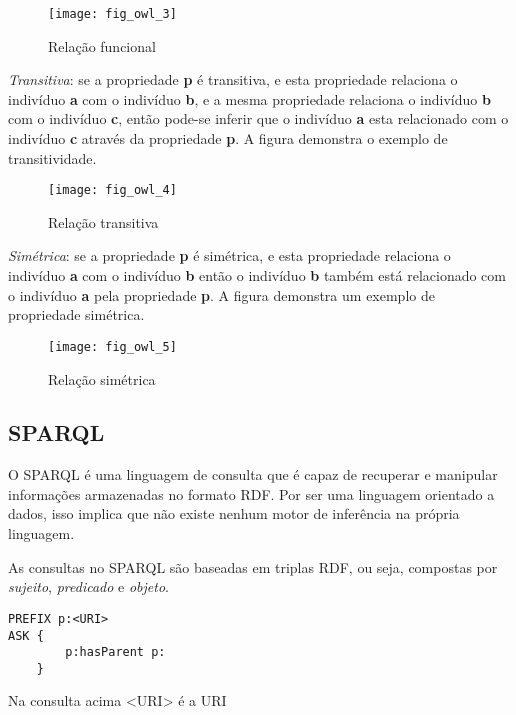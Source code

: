 \begin{itemize}
    \begin{figure}[!h]
      \centering
      \texttt{[image: fig\_owl\_3]} 
      \caption{Relação funcional}
      \label{fig:fig_owl_3} 
    \end{figure}

    \vskip 0.6cm
    
    \textit{Transitiva}: se a propriedade \textbf{p} é transitiva, e esta 
    propriedade relaciona o indivíduo \textbf{a} com o indivíduo \textbf{b}, e a
    mesma propriedade relaciona o indivíduo \textbf{b} com o indivíduo \textbf{c},
    então pode-se inferir que o indivíduo \textbf{a} esta relacionado com o 
    indivíduo \textbf{c} através da propriedade \textbf{p}. A figura demonstra 
    o exemplo de transitividade.
    
    \begin{figure}[!h]
      \centering
      \texttt{[image: fig\_owl\_4]} 
      \caption{Relação transitiva}
      \label{fig:fig_owl_4} 
    \end{figure}
    
    \vskip 0.6cm
    
    \textit{Simétrica}: se a propriedade \textbf{p} é simétrica, e esta 
    propriedade relaciona o indivíduo \textbf{a} com o indivíduo \textbf{b} então 
    o indivíduo \textbf{b} também está relacionado com o indivíduo \textbf{a} pela
    propriedade \textbf{p}. A figura demonstra um exemplo de propriedade simétrica.
    
    \begin{figure}[!h]
      \centering
      \texttt{[image: fig\_owl\_5]} 
      \caption{Relação simétrica}
      \label{fig:fig_owl_5} 
    \end{figure}
    
    \vskip 0.6cm
\end{itemize}

\subsection{SPARQL}
\label{sec:sparql}

O SPARQL é uma linguagem de consulta que é capaz de recuperar e manipular 
informações armazenadas no formato RDF. Por ser uma linguagem orientado a dados, 
isso implica que não existe nenhum motor de inferência na própria linguagem.

As consultas no SPARQL são baseadas em triplas RDF, ou seja, compostas por 
\textit{sujeito}, \textit{predicado} e \textit{objeto}.

\lstset{language=SQL,basicstyle=\ttfamily,breaklines=true}
\begin{lstlisting}
PREFIX p:<URI>
ASK {
        p:hasParent p:
    }
\end{lstlisting} 

\vskip 0.6cm

Na consulta acima <URI> é a URI
